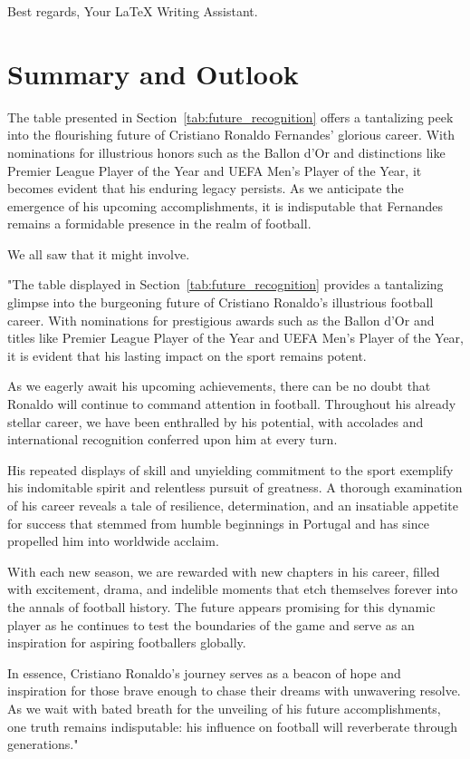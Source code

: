 \documentclass{article}
\begin{document}
Best regards,
Your LaTeX Writing Assistant.

 \section*{Summary and Outlook}

The table presented in Section~\ref{tab:future_recognition} offers a tantalizing peek into the flourishing future of Cristiano Ronaldo Fernandes' glorious career. With nominations for illustrious honors such as the Ballon d'Or and distinctions like Premier League Player of the Year and UEFA Men's Player of the Year, it becomes evident that his enduring legacy persists. As we anticipate the emergence of his upcoming accomplishments, it is indisputable that Fernandes remains a formidable presence in the realm of football.

We all saw that it might involve.

 "The table displayed in Section~\ref{tab:future_recognition} provides a tantalizing glimpse into the burgeoning future of Cristiano Ronaldo's illustrious football career. With nominations for prestigious awards such as the Ballon d'Or and titles like Premier League Player of the Year and UEFA Men's Player of the Year, it is evident that his lasting impact on the sport remains potent.

As we eagerly await his upcoming achievements, there can be no doubt that Ronaldo will continue to command attention in football. Throughout his already stellar career, we have been enthralled by his potential, with accolades and international recognition conferred upon him at every turn.

His repeated displays of skill and unyielding commitment to the sport exemplify his indomitable spirit and relentless pursuit of greatness. A thorough examination of his career reveals a tale of resilience, determination, and an insatiable appetite for success that stemmed from humble beginnings in Portugal and has since propelled him into worldwide acclaim.

With each new season, we are rewarded with new chapters in his career, filled with excitement, drama, and indelible moments that etch themselves forever into the annals of football history. The future appears promising for this dynamic player as he continues to test the boundaries of the game and serve as an inspiration for aspiring footballers globally.

In essence, Cristiano Ronaldo's journey serves as a beacon of hope and inspiration for those brave enough to chase their dreams with unwavering resolve. As we wait with bated breath for the unveiling of his future accomplishments, one truth remains indisputable: his influence on football will reverberate through generations."
\end{document}
